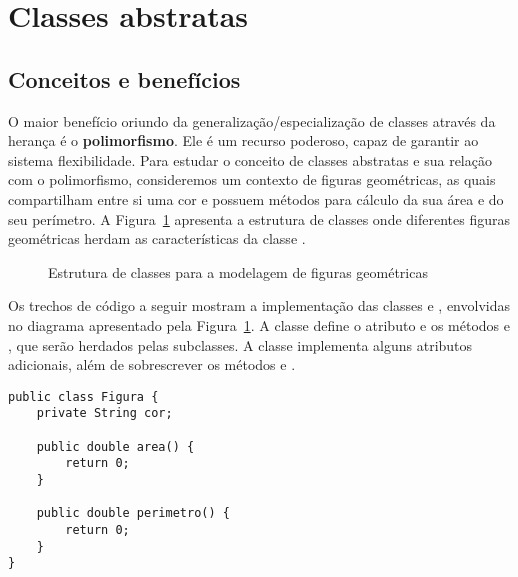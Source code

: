 \section{Classes abstratas}

\subsection{Conceitos e benefícios}

O maior benefício oriundo da generalização/especialização de classes através da herança é o \textbf{polimorfismo}. Ele é um recurso poderoso, capaz de garantir ao sistema flexibilidade. Para estudar o conceito de classes abstratas e sua relação com o polimorfismo, consideremos um contexto de figuras geométricas, as quais compartilham entre si uma cor e possuem métodos para cálculo da sua área e do seu perímetro. A Figura~\ref{fig:abstratas-figuras} apresenta a estrutura de classes onde diferentes figuras geométricas herdam as características da classe .

\begin{figure}[h]
	\centering
	
	
	\caption{Estrutura de classes para a modelagem de figuras geométricas}
	\label{fig:abstratas-figuras}
\end{figure}

Os trechos de código a seguir mostram a implementação das classes  e , envolvidas no diagrama apresentado pela Figura~\ref{fig:abstratas-figuras}. A classe  define o atributo  e os métodos  e , que serão herdados pelas subclasses. A classe  implementa alguns atributos adicionais, além de sobrescrever os métodos  e .

\begin{verbatim}
public class Figura {
	private String cor;
	
	public double area() {
		return 0;
	}
	
	public double perimetro() {
		return 0;
	}
}
\end{verbatim}

